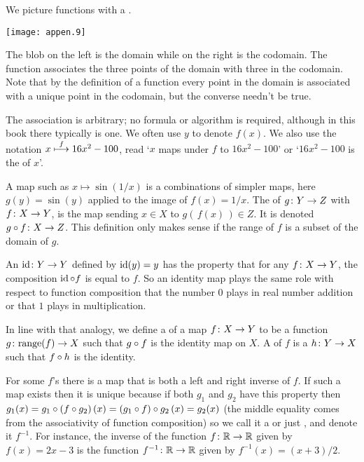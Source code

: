 We picture functions with a 
.
\begin{center}
  \texttt{[image: appen.9]}
\end{center}
The blob on the left is the domain while on the right is the
codomain.
The function associates the three points of the domain with three in the
codomain.
Note that by the definition of a function 
every point in the domain is associated with
a unique point in the codomain, but the converse needn't be true.

The association is arbitrary; no formula or algorithm is required, although in
this book there typically is one.
We often use $y$ to denote $f(x)$. 
We also use the notation \( x\stackrel{f}{\longmapsto} 16x^2-100 \), read
`\( x \) maps under \( f \) to \( 16x^2-100 \)' or
`\( 16x^2-100 \) is the 
of \( x \)'.

A map such as \( x\mapsto \sin(1/x) \) is a
combinations of simpler maps, here
\( g(y)=\sin(y) \) applied to the image of \( f(x)=1/x \).
The  
of \( \mbox{$g\colon Y\to Z$} \) with \( \mbox{$f\colon X\to Y$} \),
is the map sending
\( x\in X \) to \( g(\, f(x)\,)\in Z \).
It is denoted \( \mbox{$g\mathbin{\circ} f\colon X\to Z$} \).
This definition only makes sense if the range of \( f \) is a
subset of the domain of \( g \).

An 
\( \mbox{$\operatorname{id}\colon Y\to Y$} \) defined by
\( \operatorname{id}(y)=y \) has the property that for any \( \mbox{$f\colon X\to Y$} \),
the composition \( \operatorname{id}\mathbin{\circ} f \) is equal to \( f \).
So an identity map plays the same role with respect to function composition
that the number \( 0 \) plays in real number addition or that 
\( 1 \) plays in multiplication.

In line with that analogy, we define a
 of a map 
\( \mbox{$f\colon X\to Y$} \) to be a
function \( \mbox{$g\colon \text{range}(f)\to X$} \) such that \( g\mathbin{\circ} f \)
is the identity map on \( X \).
A  
of \( f \) is a
\( \mbox{$h\colon Y\to X$} \) such that \( f\mathbin{\circ} h \) is the identity.

For some $f$'s there is a map that is 
both a left and right inverse of \( f \).
If such a map exists then it is unique because if both \( g_1 \) and
\( g_2 \) have this property then
\( g_1(x)=g_1\mathbin{\circ}  (f\mathbin{\circ} g_2)\,(x)
         =(g_1\mathbin{\circ} f) \mathbin{\circ} g_2\,(x)
         =g_2(x) \)
(the middle equality comes from the associativity of function composition)
so we call it a  or just  
,
and denote it \( f^{-1} \). 
For instance, the inverse of the function \( \mbox{$f\colon \mathbb{R}\to \mathbb{R}$} \)
given by \( f(x)=2x-3 \) is the function \( \mbox{$f^{-1}\colon \mathbb{R}\to \mathbb{R}$} \)
given by \( f^{-1}(x)=(x+3)/2 \).

